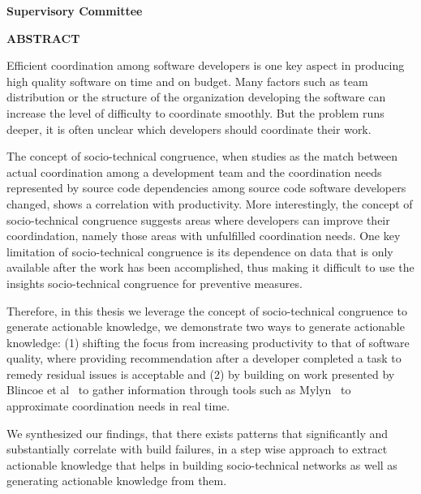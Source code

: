 \newpage
{}

\noindent \textbf{Supervisory Committee}
\tpbreak
\panel

\begin{center}
\textbf{ABSTRACT}
\end{center}
Efficient coordination among software developers is one key aspect in producing high quality software on time and on budget.
Many factors such as team distribution or the structure of the organization developing the software can increase the level of difficulty to coordinate smoothly.
But the problem runs deeper, it is often unclear which developers should coordinate their work.

The concept of socio-technical congruence, when studies as the match between actual coordination among a development team and the coordination needs represented by source code dependencies among source code software developers changed, shows a correlation with productivity.
More interestingly, the concept of socio-technical congruence suggests areas where developers can improve their coordindation, namely those areas with unfulfilled coordination needs.
One key limitation of socio-technical congruence is its dependence on data that is only available after the work has been accomplished, thus making it difficult to use the insights socio-technical congruence for preventive measures.

Therefore, in this thesis we leverage the concept of socio-technical congruence to generate actionable knowledge, we demonstrate two ways to generate actionable knowledge: (1) shifting the focus from increasing productivity to that of software quality, where providing recommendation after a developer completed a task to remedy residual issues is acceptable and (2) by building on work presented by Blincoe et al~\cite{blincoe:cscw:2012} to gather information through tools such as Mylyn~\cite{kersten:aosd:2005} to approximate coordination needs in real time.

We synthesized our findings, that there exists patterns that significantly and substantially correlate with build failures, in a step wise approach to extract actionable knowledge that helps in building socio-technical networks as well as generating actionable knowledge from them.
